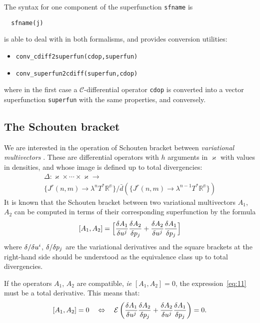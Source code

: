 The syntax for one component of the superfunction \texttt{sfname} is
\begin{verbatim}
  sfname(j)
\end{verbatim}

\cde is able to deal with \cdiffops in both formalisms, and provides
conversion utilities:
\begin{itemize}
\item \texttt{conv\_cdiff2superfun(cdop,superfun)}
\item \texttt{conv\_superfun2cdiff(superfun,cdop)}
\end{itemize}
where in the first case a $\mathcal{C}$-differential operator \texttt{cdop} is
converted into a vector superfunction \texttt{superfun} with the same
properties, and conversely.

\subsection{The Schouten bracket}
\label{cdesec:schouten-bracket}

We are interested in the operation of Schouten bracket between
\emph{variational multivectors} \cite{IgoninVerbovetskyVitolo:2004}. These are differential operators
with $h$ arguments in $\varkappa$ with values in densities, and whose image is
defined up to total divergencies:
\begin{multline}
  \label{eq:16}
  \Delta\colon \varkappa\times\cdots\times \varkappa \to
  \\
  \{J^r(n,m) \to \lambda^nT^*\mathbb{R^n}\}/
  \bar{d}(\{J^r(n,m) \to \lambda^{n-1} T^*\mathbb{R^n}\})
\end{multline}
It is known \cite{Getzler:2002,KerstenKrasilshchikVerboretsky:2004} that the Schouten bracket between two variational
multivectors $A_1$, $A_2$ can be computed in terms of their corresponding
superfunction by the formula
\begin{equation}\label{eq:11}
  [A_1,A_2] = \Big[\fd{A_1}{u^j}\fd{A_2}{p_j} + \fd{A_2}{u^j}\fd{A_1}{p_j}\Big]
\end{equation}
where $\fd{}{u^i}$, $\fd{}{p_j}$ are the variational derivatives and
the square brackets at the right-hand side should be understood as the
equivalence class up to total divergencies.

If the operators $A_1$, $A_2$ are compatible, \emph{ie} $[A_1,A_2]=0$, the
expression~\eqref{eq:11} must be a total derivative. This means that:
\begin{equation}
  \label{eq:14}
  [A_1,A_2] = 0 \quad\Leftrightarrow\quad
  \mathcal{E}\left(\fd{A_1}{u^j}\fd{A_2}{p_j} +
    \fd{A_2}{u^j}\fd{A_1}{p_j}\right)=0.
\end{equation}

